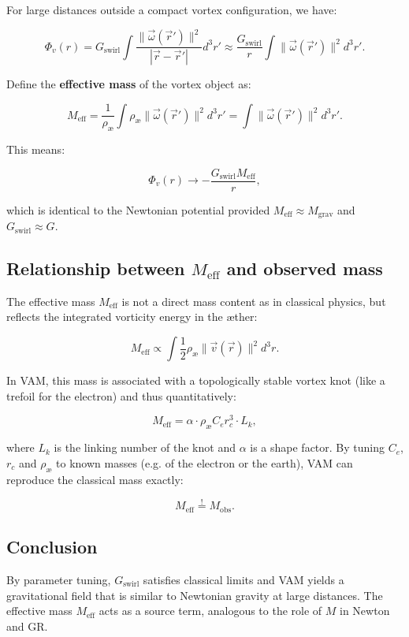 For large distances outside a compact vortex configuration, we have:

\begin{equation}
  \Phi_v(r) = G_\text{swirl} \int \frac{\|\vec{\omega}(\vec{r}')\|^2}{|\vec{r} - \vec{r}'|} d^3r' \approx \frac{G_\text{swirl}}{r} \int \|\vec{\omega}(\vec{r}')\|^2 d^3r'.
\end{equation}

Define the \textbf{effective mass} of the vortex object as:

\begin{equation}
  M_\text{eff} = \frac{1}{\rho_\text{æ}} \int \rho_\text{æ} \|\vec{\omega}(\vec{r}')\|^2 d^3r' = \int \|\vec{\omega}(\vec{r}')\|^2 d^3r'.
\end{equation}

This means:

\begin{equation}
  \Phi_v(r) \to -\frac{G_\text{swirl} M_\text{eff}}{r},
\end{equation}

which is identical to the Newtonian potential provided $M_\text{eff} \approx M_\text{grav}$ and $G_\text{swirl} \approx G$.

\subsection{Relationship between $M_\text{eff}$ and observed mass}

The effective mass $M_\text{eff}$ is not a direct mass content as in classical physics, but reflects the integrated vorticity energy in the æther:

\begin{equation}
  M_\text{eff} \propto \int \frac{1}{2} \rho_\text{æ} \|\vec{v}(\vec{r})\|^2 d^3r.
\end{equation}

In VAM, this mass is associated with a topologically stable vortex knot (like a trefoil for the electron) and thus quantitatively:

\begin{equation}
  M_\text{eff} = \alpha \cdot \rho_\text{æ} C_e r_c^3 \cdot L_k,
\end{equation}

where $L_k$ is the linking number of the knot and $\alpha$ is a shape factor. By tuning $C_e$, $r_c$ and $\rho_\text{æ}$ to known masses (e.g. of the electron or the earth), VAM can reproduce the classical mass exactly:

\begin{equation}
  M_\text{eff} \overset{!}{=} M_\text{obs}.
\end{equation}

\subsection{Conclusion}

By parameter tuning, $G_\text{swirl}$ satisfies classical limits and VAM yields a gravitational field that is similar to Newtonian gravity at large distances. The effective mass $M_\text{eff}$ acts as a source term, analogous to the role of $M$ in Newton and GR.